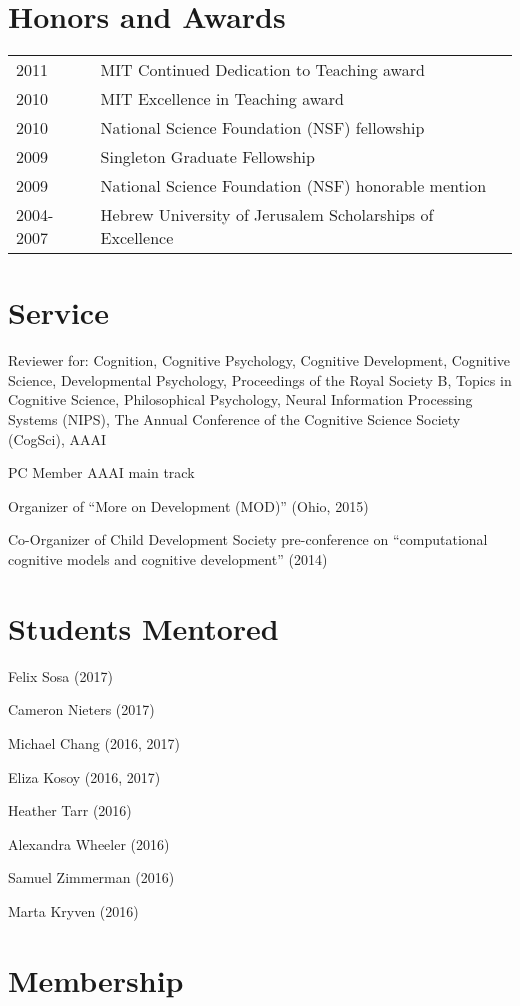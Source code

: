 \documentclass[margin,line,pifont,palatino,courier]{res}
\begin{document}
\begin{resume}
\section{\sc Honors and Awards}

\begin{tabular}{@{}p{0.8in}p{4in}}
2011 & MIT Continued Dedication to Teaching award  \\
2010 & MIT Excellence in Teaching award  \\
2010 & National Science Foundation (NSF) fellowship\\
2009 & Singleton Graduate Fellowship \\
2009 & National Science Foundation (NSF) honorable mention\\
2004-2007 & Hebrew University of Jerusalem Scholarships of Excellence
\end{tabular}


\section{\sc Service}

Reviewer for: Cognition, Cognitive Psychology, Cognitive Development, Cognitive Science, Developmental Psychology, Proceedings of the Royal Society B, Topics in Cognitive Science, Philosophical Psychology, Neural Information Processing Systems (NIPS), The Annual Conference of the Cognitive Science Society (CogSci), AAAI

PC Member AAAI main track

Organizer of ``More on Development (MOD)'' (Ohio, 2015)

Co-Organizer of Child Development Society pre-conference on ``computational cognitive models and cognitive development'' (2014)

\section{\sc Students Mentored}

Felix Sosa (2017)

Cameron Nieters (2017)

Michael Chang (2016, 2017)

Eliza Kosoy (2016, 2017)

Heather Tarr (2016)

Alexandra Wheeler (2016)

Samuel Zimmerman (2016)

Marta Kryven (2016)


\section{\sc Membership}


\end{resume}
\end{document}
